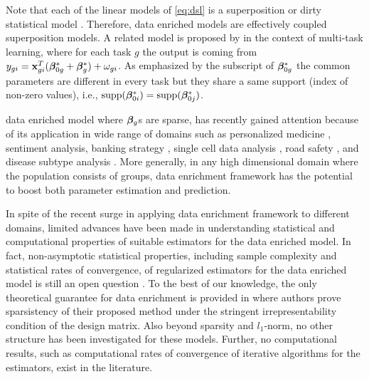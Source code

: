 Note that each of the linear models of \eqref{eq:dsl} is a superposition \cite{guba16} or dirty statistical model \cite{yara13}. Therefore, data enriched models are effectively coupled superposition models.
A related model is proposed by \cite{jrsr10} in the context of multi-task learning, where for each task $g$ the output is coming from $y_{gi} = \mathbf{x}_{gi}^T (\boldsymbol{\beta}_{0g}^* + \boldsymbol{\beta}^*_g) + \omega_{gi}$.
As emphasized by the subscript of $\boldsymbol{\beta}_{0g}^*$ the common parameters are different in every task but they share a same support (index of non-zero values), i.e., $\text{supp}(\boldsymbol{\beta}_{0i}^*) = \text{supp}(\boldsymbol{\beta}_{0j}^*)$.

data enriched model where $\boldsymbol{\beta}_g$s are sparse, has recently gained attention because of its application in wide range of domains such as personalized medicine \cite{domu16}, sentiment analysis, banking strategy \cite{grti16}, single cell data analysis \cite{olvi15}, road safety \cite{olvi14}, and disease subtype analysis \cite{domu16}.
More generally, in any high dimensional domain where the population consists of groups, data enrichment framework has the potential to boost both parameter estimation and prediction.

In spite of the recent surge in applying data enrichment framework to different domains, limited advances have been made in
understanding statistical and computational properties of suitable estimators for the data enriched model.
In fact, non-asymptotic statistical properties, including sample complexity and statistical rates of convergence, of regularized estimators for the data enriched model is still an open question \cite{grti16, olvi14}.
To the best of our knowledge, the only theoretical guarantee for data enrichment is provided in \cite{olvi15} where authors prove sparsistency of their proposed method under the stringent irrepresentability condition of the design matrix.
Also beyond sparsity and $l_1$-norm, no other structure has been investigated for these models. Further, no computational results, such as computational rates of convergence of iterative algorithms for the estimators, exist in the literature.


